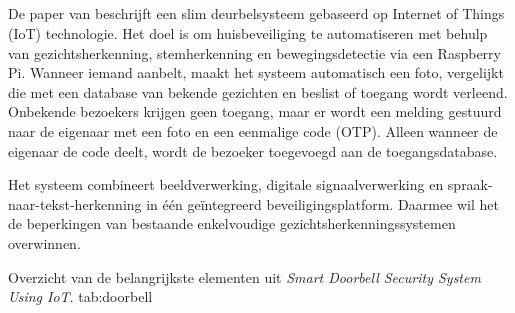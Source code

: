 \documentclass[nonacm,sigconf]{acmart}
\begin{document}
    \subsection{}

    De paper van \parencite{chaudhari2020smart} beschrijft een slim deurbelsysteem gebaseerd op Internet of Things (IoT) technologie.
    Het doel is om huisbeveiliging te automatiseren met behulp van gezichtsherkenning, stemherkenning en bewegingsdetectie via een Raspberry Pi.
    Wanneer iemand aanbelt, maakt het systeem automatisch een foto, vergelijkt die met een database van bekende gezichten en beslist of toegang wordt verleend.
    Onbekende bezoekers krijgen geen toegang, maar er wordt een melding gestuurd naar de eigenaar met een foto en een eenmalige code (OTP). Alleen wanneer de eigenaar de code deelt, wordt de bezoeker toegevoegd aan de toegangsdatabase.

    Het systeem combineert beeldverwerking, digitale signaalverwerking en spraak-naar-tekst-herkenning in één geïntegreerd beveiligingsplatform.
    Daarmee wil het de beperkingen van bestaande enkelvoudige gezichtsherkenningssystemen overwinnen.

    \SimpleTable
    {Overzicht van de belangrijkste elementen uit \textit{Smart Doorbell Security System Using IoT}.}
    {tab:doorbell}
    {
    }

    \subsection{}
    \parencite{tabassum2023exploring}

\end{document}
